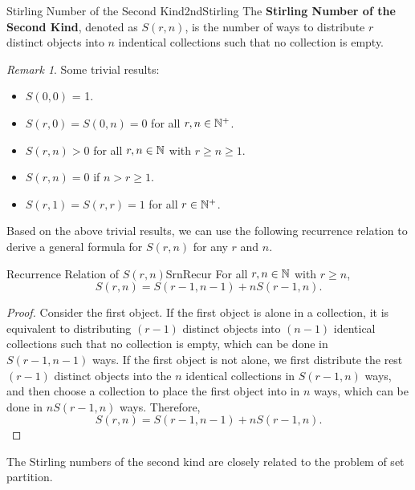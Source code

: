 \documentclass[math]{amznotes}
\theoremstyle{remark}
\newtheorem*{remark}{Remark}
\begin{document}
\begin{dfnbox}{Stirling Number of the Second Kind}{2ndStirling}
    The {\color{red} \textbf{Stirling Number of the Second Kind}}, denoted as $S(r, n)$, is the number of ways to distribute $r$ distinct objects into $n$ indentical collections such that no collection is empty.
\end{dfnbox}
\begin{notebox}
    \begin{remark}
        Some trivial results:
        \begin{itemize}
            \item $S(0, 0)$ = 1.
            \item $S(r, 0) = S(0, n) = 0$ for all $r, n \in \mathbb{N}^+$.
            \item $S(r, n) > 0$ for all $r, n \in \mathbb{N}$ with $r \geq n \geq 1$.
            \item $S(r, n) = 0$ if $n > r \geq 1$.
            \item $S(r, 1) = S(r, r) = 1$ for all $r \in \mathbb{N}^+$.
        \end{itemize}
    \end{remark}
\end{notebox}
Based on the above trivial results, we can use the following recurrence relation to derive a general formula for $S(r, n)$ for any $r$ and $n$.
\begin{thmbox}{Recurrence Relation of $S(r, n)$}{SrnRecur}
    For all $r, n \in \mathbb{N}$ with $r \geq n$,
    \begin{equation*}
        S(r, n) = S(r - 1, n - 1) + nS(r - 1, n).
    \end{equation*}
    \tcblower
    \begin{proof}
        Consider the first object. If the first object is alone in a collection, it is equivalent to distributing $(r - 1)$ distinct objects into $(n - 1)$ identical collections such that no collection is empty, which can be done in $S(r - 1, n - 1)$ ways. If the first object is not alone, we first distribute the rest $(r - 1)$ distinct objects into the $n$ identical collections in $S(r - 1, n)$ ways, and then choose a collection to place the first object into in $n$ ways, which can be done in $nS(r - 1, n)$ ways. Therefore, 
        \begin{equation*}
            S(r, n) = S(r - 1, n - 1) + nS(r - 1, n).
        \end{equation*}
    \end{proof}
\end{thmbox}
The Stirling numbers of the second kind are closely related to the problem of set partition.
\end{document}
